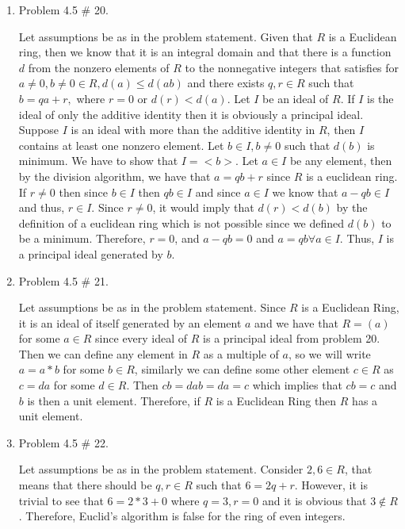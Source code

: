 \documentclass[11pt]{article}
\begin{document}
\begin{enumerate}
\pagebreak
\item Problem 4.5 \# 20.

Let assumptions be as in the problem statement. Given that $R$ is a Euclidean ring, then we know that it is an integral domain and that there is a function $d$ from the nonzero elements of $R$ to the nonnegative integers that satisfies for $a\neq0,b\neq0\in R,d(a)\leq d(ab)$ and there exists $q,r\in R$ such that $b=qa+r,$ where $r=0$ or $d(r)<d(a)$. Let $I$ be an ideal of $R$. If $I$ is the ideal of only the additive identity then it is obviously a principal ideal. Suppose $I$ is an ideal with more than the additive identity in $R$, then $I$ contains at least one nonzero element. Let $b\in I, b\neq 0$ such that $d(b)$ is minimum. We have to show that $I = <b>$. Let $a\in I$ be any element, then by the division algorithm, we have that $a=qb+r$ since $R$ is a euclidean ring. If $r\neq 0$ then since $b\in I$ then $qb\in I$ and since $a\in I$ we know that $a-qb\in I$ and thus, $r\in I.$ Since $r\neq 0$, it would imply that $d(r)<d(b)$ by the definition of a euclidean ring which is not possible since we defined $d(b)$ to be a minimum. Therefore, $r=0$, and $a-qb=0$ and $a=qb\forall a\in I$. Thus, $I$ is a principal ideal generated by $b.$

\pagebreak
\item Problem 4.5 \# 21.

Let assumptions be as in the problem statement. Since $R$ is a Euclidean Ring, it is an ideal of itself generated by an element $a$ and we have that $R=(a)$ for some $a\in R$ since every ideal of $R$ is a principal ideal from problem 20. Then we can define any element in $R$ as a multiple of $a$, so we will write $a=a*b$ for some $b\in R$, similarly we can define some other element $c\in R$ as $c=da$ for some $d\in R$. Then $cb = dab = da = c$ which implies that $cb=c$ and $b$ is then a unit element. Therefore, if $R$ is a Euclidean Ring then $R$ has a unit element.

\pagebreak
\item Problem 4.5 \# 22.

Let assumptions be as in the problem statement. Consider $2,6\in R$, that means that there should be $q,r\in R$ such that $6=2q+r$. However, it is trivial to see that $6=2*3+0$ where $q=3,r=0$ and it is obvious that $3\notin R$. Therefore, Euclid's algorithm is false for the ring of even integers.

\end{enumerate}
\end{document}
